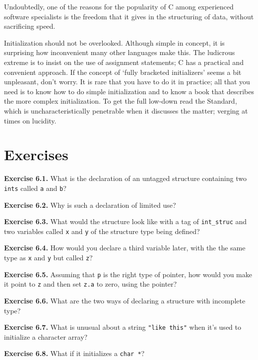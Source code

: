   Undoubtedly, one of the reasons for the popularity of C among experienced
   software specialists is the freedom that it gives in the structuring of
   data, without sacrificing speed.


  Initialization should not be overlooked. Although simple in concept, it is
   surprising how inconvenient many other languages make this. The ludicrous
   extreme is to insist on the use of assignment statements; C has a practical
   and convenient approach. If the concept of `fully bracketed
   initializers' seems a bit unpleasant, don't worry. It is rare that you
   have to do it in practice; all that you need is to know how to do simple
   initialization and to know a book that describes the more complex
   initialization. To get the full low-down read the Standard, which is
   uncharacteristically penetrable when it discusses the matter; verging at
   times on lucidity.


 
        \section{Exercises}
        


  \textbf{Exercise 6.1.} What is the declaration of an untagged structure
   containing two \texttt{ints} called \texttt{a} and
   \texttt{b}?


  \textbf{Exercise 6.2.} Why is such a declaration of limited use?


  \textbf{Exercise 6.3.} What would the structure look like with a tag of
   \texttt{int\_struc} and two variables called \texttt{x} and
   \texttt{y} of the structure type being defined?


  \textbf{Exercise 6.4.} How would you declare a third variable later, with the
   the same type as \texttt{x} and \texttt{y} but called
   \texttt{z}?


  \textbf{Exercise 6.5.} Assuming that \texttt{p} is the right type of
   pointer, how would you make it point to \texttt{z} and then set
   \texttt{z.a} to zero, using the pointer?


  \textbf{Exercise 6.6.} What are the two ways of declaring a structure with
   incomplete type?


  \textbf{Exercise 6.7.} What is unusual about a string \texttt{"like this"}
   when it's used to initialize a character array?


  \textbf{Exercise 6.8.} What if it initializes a
   \texttt{char *}?


